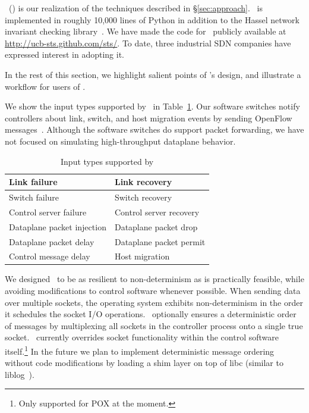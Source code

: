 \projectname~(\projectmeaning) is our realization of the techniques described in
\S\ref{sec:approach}. \projectname~is implemented in roughly 10,000 lines of Python in
addition to the Hassel network invariant checking library~\cite{hsa}. We have
made the code
for \projectname~publicly available at \url{http://ucb-sts.github.com/sts/}.
To date, three industrial SDN companies have expressed interest in adopting it.

In the rest of this section, we highlight salient points of \projectname's
design, and illustrate a workflow for users of \projectname.

We show the input types supported by \projectname~in Table~\ref{tab:inputs}.
Our software switches notify controllers about link, switch, and host migration events
by sending OpenFlow messages~\cite{openflow}.
Although the software switches do support packet forwarding, we
have not focused on simulating high-throughput dataplane behavior.

\begin{table}
\centering
\begin{tabular}{|l|l|}
\hline
Link failure & Link recovery \\
\hline
Switch failure & Switch recovery \\
\hline
Control server failure & Control server recovery \\
\hline
Dataplane packet injection & Dataplane packet drop \\
\hline
Dataplane packet delay & Dataplane packet permit \\
\hline
Control message delay & Host migration \\
\hline
\end{tabular}
\caption{Input types supported by \projectname}
\label{tab:inputs}
\end{table}

We designed \projectname~to be as resilient to non-determinism as is
practically feasible, while avoiding modifications to control software whenever possible.
When sending data over multiple sockets, the operating system exhibits
non-determinism in the order it schedules the socket I/O operations.
\projectname~optionally ensures a deterministic order of messages
by multiplexing all sockets in the controller process
onto a single true socket. \projectname~currently overrides socket functionality within the control
software itself.\footnote{Only supported for POX at the moment.}
In the future we plan to implement deterministic message ordering without code modifications by
loading a shim layer on top of
libc (similar to liblog~\cite{Geels:2006:RDD:1267359.1267386}).

